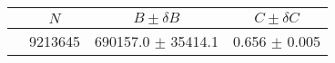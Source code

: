 \begin{tabular}{lccc}
\hline
    &   $N$   & $B \pm \delta B$  &  $C \pm \delta C$ \\
\hline
                               & 9213645    & 690157.0   $\pm$ 35414.1 & 0.656      $\pm$ 0.005 \\
\hline
\end{tabular}
